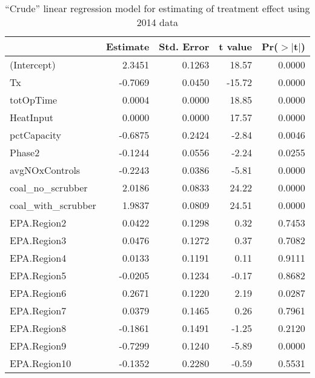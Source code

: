 \begin{table}[ht]
\centering
\begin{tabular}{lrrrr}
  \toprule
                       & Estimate & Std. Error & t value & Pr($>$$|$t$|$) \\ 
  \midrule
(Intercept)            & 2.3451   & 0.1263     & 18.57   & 0.0000         \\  
  Tx                   & -0.7069  & 0.0450     & -15.72  & 0.0000         \\  
  totOpTime            & 0.0004   & 0.0000     & 18.85   & 0.0000         \\ 
  HeatInput            & 0.0000   & 0.0000     & 17.57   & 0.0000         \\ 
  pctCapacity          & -0.6875  & 0.2424     & -2.84   & 0.0046         \\ 
  Phase2               & -0.1244  & 0.0556     & -2.24   & 0.0255         \\ 
  avgNOxControls       & -0.2243  & 0.0386     & -5.81   & 0.0000         \\ 
  coal\_no\_scrubber   & 2.0186   & 0.0833     & 24.22   & 0.0000         \\ 
  coal\_with\_scrubber & 1.9837   & 0.0809     & 24.51   & 0.0000         \\ 
  EPA.Region2          & 0.0422   & 0.1298     & 0.32    & 0.7453         \\ 
  EPA.Region3          & 0.0476   & 0.1272     & 0.37    & 0.7082         \\ 
  EPA.Region4          & 0.0133   & 0.1191     & 0.11    & 0.9111         \\ 
  EPA.Region5          & -0.0205  & 0.1234     & -0.17   & 0.8682         \\ 
  EPA.Region6          & 0.2671   & 0.1220     & 2.19    & 0.0287         \\ 
  EPA.Region7          & 0.0379   & 0.1465     & 0.26    & 0.7961         \\ 
  EPA.Region8          & -0.1861  & 0.1491     & -1.25   & 0.2120         \\ 
  EPA.Region9          & -0.7299  & 0.1240     & -5.89   & 0.0000         \\ 
  EPA.Region10         & -0.1352  & 0.2280     & -0.59   & 0.5531         \\ 
   \bottomrule
\end{tabular}
\caption{``Crude'' linear regression model for estimating of treatment
  effect using 2014 data}
\label{tab:crude-lm-14}
\end{table}

